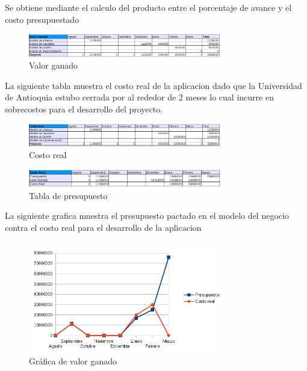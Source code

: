 \documentclass[12pt,oneside,letterpaper]{report}
\begin{document}
Se obtiene mediante el calculo del producto entre el porcentaje de avance y el costo presupuestado

\begin{figure}[h!]
  \centering
      \includegraphics[width=0.75\textwidth]{./img/imagen3.png}
  \caption{Valor ganado}
\end{figure}

La siguiente tabla muestra el costo real de la aplicacion dado que la Universidad de Antioquia estubo cerrada por al rededor de 2 meses lo cual incurre en sobrecostos para el desarrollo del proyecto.

\begin{figure}[h!]
  \centering
      \includegraphics[width=0.75\textwidth]{./img/imagen4.png}
  \caption{Costo real}
\end{figure}

\begin{figure}[h!]
  \centering
      \includegraphics[width=0.75\textwidth]{./img/imagen5.png}
  \caption{Tabla de presupuesto}
\end{figure}

La siguiente grafica muestra el presupuesto pactado en el modelo del negocio contra el costo real para el desarrollo de la aplicacion

\begin{figure}[h!]
  \centering
      \includegraphics[width=0.75\textwidth]{./img/imagen6.png}
  \caption{Gráfica de valor ganado}
\end{figure}
\end{document}

